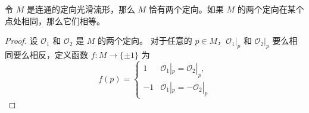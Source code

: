 \begin{proposition}
  令 $M$ 是连通的定向光滑流形，那么 $M$ 恰有两个定向。如果 $M$
  的两个定向在某个点处相同，那么它们相等。
\end{proposition}
\begin{proof}
  设 $\mathcal{O}_1$ 和 $\mathcal{O}_2$ 是 $M$ 的两个定向。
  对于任意的 $p\in M$，$\mathcal{O}_1|_p$ 和 $\mathcal{O}_2|_p$
  要么相同要么相反，定义函数 $f:M\to \{\pm 1\}$ 为
  \[
    f(p)=\begin{cases}
      1 & \mathcal{O}_1|_p=\mathcal{O}_2|_p,\\
      -1 & \mathcal{O}_1|_p=-\mathcal{O}_2|_p
    \end{cases}
  \]
\end{proof}


